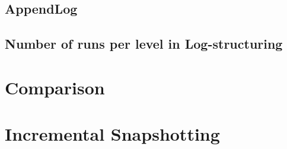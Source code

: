 

\subsection{AppendLog}


\subsection{Number of runs per level in Log-structuring}
\label{subsection-max-runs-per-level}


\section{Comparison}



\section{Incremental Snapshotting}

